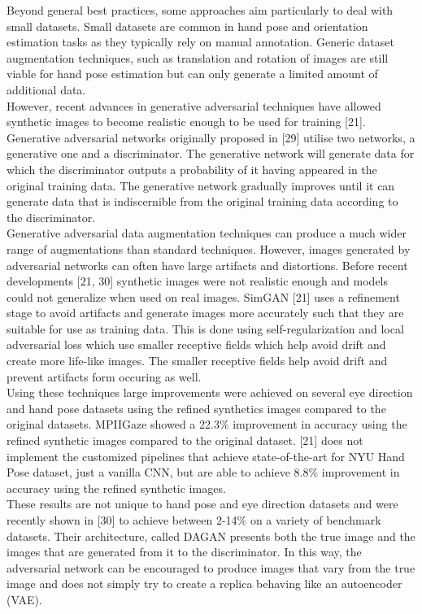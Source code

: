 \documentclass{article}
\begin{document}
Beyond general best practices, some approaches aim particularly to deal with small datasets. Small datasets are common in hand pose and orientation estimation tasks as they typically rely on manual annotation.  Generic dataset augmentation techniques, such as translation and rotation of images are still viable for hand pose estimation but can only generate a limited amount of additional data. \\

However, recent advances in generative adversarial techniques have allowed synthetic images to become realistic enough to be used for training [21]. Generative adversarial networks originally proposed in [29] utilise two networks, a generative one and a discriminator. The generative network will generate data for which the discriminator outputs a probability of it having appeared in the original training data. The generative network gradually improves until it can generate data that is indiscernible from the original training data according to the discriminator. \\

Generative adversarial data augmentation techniques can produce a much wider range of augmentations than standard techniques. However, images generated by adversarial networks can often have large artifacts and distortions. Before recent developments [21, 30] synthetic images were not realistic enough and models could not generalize when used on real images. SimGAN [21] uses a refinement stage to avoid artifacts and generate images more accurately such that they are suitable for use as training data. This is done using self-regularization and local adversarial loss which use smaller receptive fields which help avoid drift and create more life-like images. The smaller receptive fields help avoid drift and prevent artifacts form occuring as well.\\

Using these techniques large improvements were achieved on several eye direction and hand pose datasets using the refined synthetics images compared to the original datasets. MPIIGaze showed a 22.3\% improvement in accuracy using the refined synthetic images compared to the original dataset. [21] does not implement the customized pipelines that achieve state-of-the-art for NYU Hand Pose dataset, just a vanilla CNN, but are able to achieve 8.8\% improvement in accuracy using the refined synthetic images.\\

These results are not unique to hand pose and eye direction datasets and were recently shown in [30] to achieve between 2-14\% on a variety of benchmark datasets. Their architecture, called DAGAN presents both the true image and the images that are generated from it to the discriminator. In this way, the adversarial network can be encouraged to produce images that vary from the true image and does not simply try to create a replica behaving like an autoencoder (VAE).\\
\end{document}
